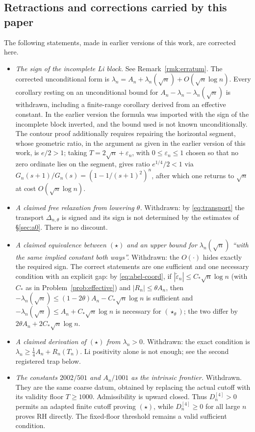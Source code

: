 \documentclass[11pt]{amsart}
\theoremstyle{definition}
\theoremstyle{remark}
\theoremstyle{definition}
\newcommand{\eps}{\varepsilon}
\begin{document}
\subsection{Retractions and corrections carried by this paper}

The following statements, made in earlier versions of this work, are corrected here.
\begin{itemize}[leftmargin=*]
\item \emph{The sign of the incomplete Li block.} See Remark~\ref{rmk:erratum}. The corrected
      unconditional form is $\lambda_n=A_n+\lambda_n(\sqrt n)+O(\sqrt n\log n)$. Every corollary
      resting on an unconditional bound for $A_n-\lambda_n-\lambda_n(\sqrt n)$ is withdrawn,
      including a finite-range corollary derived from an effective constant. In the earlier version the formula was imported with the
      sign of the incomplete block inverted, and the bound used is not known unconditionally. The contour proof additionally requires repairing the horizontal segment, whose geometric ratio, in the argument as given in the earlier version of this work, is $e/2>1$; taking $T=2\sqrt n+\eps_n$, with $0\le\eps_n\le1$ chosen so that no zero ordinate lies on the segment, gives ratio $e^{1/4}/2<1$ via
      $G_n(s+1)/G_n(s)=(1-1/(s+1)^2)^n$, after which one returns to $\sqrt n$ at cost
      $O(\sqrt n\log n)$.
\item \emph{A claimed free relaxation from lowering $\theta$.} Withdrawn: by
      \eqref{eq:transport} the transport $\Delta_{n,\theta}$ is signed and its sign is not
      determined by the estimates of \S\ref{sec:a0}. There is no discount.
\item \emph{A claimed equivalence between $(\star)$ and an upper bound for
      $\lambda_n(\sqrt n)$ ``with the same implied constant both ways''.} Withdrawn: the
      $O(\cdot)$ hides exactly the required sign. The correct statements are one sufficient and one
      necessary condition with an explicit gap: by \eqref{eq:abel-coord}, if
      $|\widetilde\eps_n|\le C_*\sqrt n\log n$ (with $C_*$ as in Problem~\ref{prob:effective}) and
      $|R_n|\le\theta A_n$, then $-\lambda_n(\sqrt n)\le(1-2\theta)A_n-C_*\sqrt n\log n$ is
      sufficient and $-\lambda_n(\sqrt n)\le A_n+C_*\sqrt n\log n$ is necessary for
      $(\star_\theta)$; the two differ by $2\theta A_n+2C_*\sqrt n\log n$.
\item \emph{A claimed derivation of $(\star)$ from $\lambda_n>0$.} Withdrawn: the exact
      condition is $\lambda_n\ge\tfrac14A_n+R_n(T_n)$. Li positivity alone is not enough; see the
      second registered trap below.
\item \emph{The constants $2002/501$ and $A_n/1001$ as the intrinsic frontier.} Withdrawn.
      They are the same coarse datum, obtained by replacing the actual cutoff with its validity
      floor $T\ge1000$.  Admissibility is upward closed.  Thus $D_n^{[4]}>0$ permits an adapted
      finite cutoff proving $(\star)$, while $D_n^{[4]}\ge0$ for all large $n$ proves RH directly.
      The fixed-floor threshold remains a valid sufficient condition.
\end{itemize}
\end{document}
